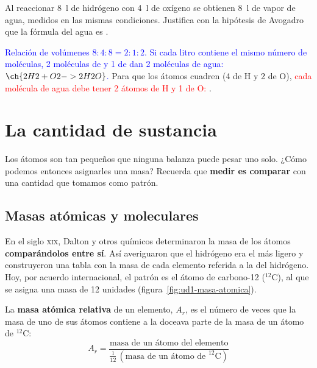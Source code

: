 \begin{exercise}
    Al reaccionar \qty{8}{\litre} de hidrógeno con \qty{4}{\litre} de oxígeno se obtienen \qty{8}{\litre} de vapor de agua,
    medidos en las mismas condiciones. Justifica con la hipótesis de Avogadro que la fórmula del agua es .
    \begin{solu}
        \textcolor{blue}{Relación de volúmenes \(8:4:8 = 2:1:2\). Si cada litro contiene el mismo número de moléculas, 2 moléculas
        de  y 1 de  dan 2 moléculas de agua: \(\ch{2 H2 + O2 -> 2 H2O}\).} Para que los átomos cuadren (4 de H y 2 de O),
        \textcolor{red}{cada molécula de agua debe tener 2 átomos de H y 1 de O: }.
    \end{solu}
\end{exercise}

\section{La cantidad de sustancia}\label{sec:ud1-mol}

Los átomos son tan pequeños que ninguna balanza puede pesar uno solo. ¿Cómo podemos entonces asignarles una masa? Recuerda
que \textbf{medir es comparar} con una cantidad que tomamos como patrón.

\subsection{Masas atómicas y moleculares}

En el siglo \textsc{xix}, Dalton y otros químicos determinaron la masa de los átomos \textbf{comparándolos entre sí}. Así
averiguaron que el hidrógeno era el más ligero y construyeron una tabla con la masa de cada elemento referida a la del
hidrógeno. Hoy, por acuerdo internacional, el patrón es el átomo de carbono-12 (\(^{12}\)C), al que se asigna una masa de 12
unidades (figura~\ref{fig:ud1-masa-atomica}).

\begin{definition}
    La \textbf{masa atómica relativa} de un elemento, \(A_r\), es el número de veces que la masa de uno de sus átomos contiene
    a la doceava parte de la masa de un átomo de \(^{12}\)C:
    \[ A_r = \frac{\text{masa de un átomo del elemento}}{\frac{1}{12}\,(\text{masa de un átomo de } ^{12}\text{C})} \]
\end{definition}

